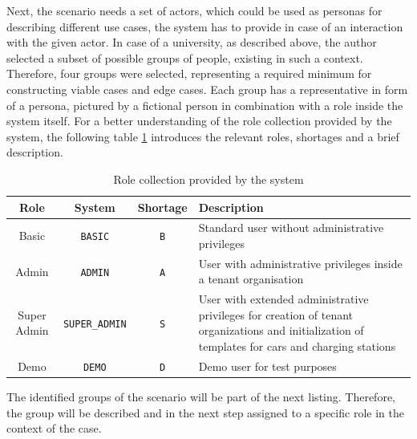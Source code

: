 Next, the scenario needs a set of actors, which could be used as personas for describing different use cases, the system has to provide in case of an interaction with the given actor. 
In case of a university, as described above, the author selected a subset of possible groups of people, existing in such a context. 
Therefore, four groups were selected, representing a required minimum for constructing viable cases and edge cases. Each group has a representative in form of a persona, pictured by a fictional person in combination with a role inside the system itself.
For a better understanding of the role collection provided by the system, the following table \ref{tab:system_role_collection} introduces the relevant roles, shortages and a brief description.

\begingroup
\setlength{\tabcolsep}{10pt} %
\renewcommand{\arraystretch}{1.5} %
\begin{table}[h!]
    \centering
    \begin{tabular}{c|c|c|m{6cm}}
        Role & System & Shortage & Description \\
        \hline
        Basic & \verb|BASIC| & \verb|B| & Standard user without administrative privileges \\
        Admin & \verb|ADMIN| & \verb|A| & User with administrative privileges inside a tenant organisation \\
        Super Admin & \verb|SUPER_ADMIN| & \verb|S| & User with extended administrative privileges for creation of tenant organizations and initialization of templates for cars and charging stations \\
        Demo & \verb|DEMO| & \verb|D| & Demo user for test purposes \\
    \end{tabular}
    \caption{Role collection provided by the system}
    \label{tab:system_role_collection}
\end{table}
\endgroup

The identified groups of the scenario will be part of the next listing. Therefore, the group will be described and in the next step assigned to a specific role in the context of the case.

